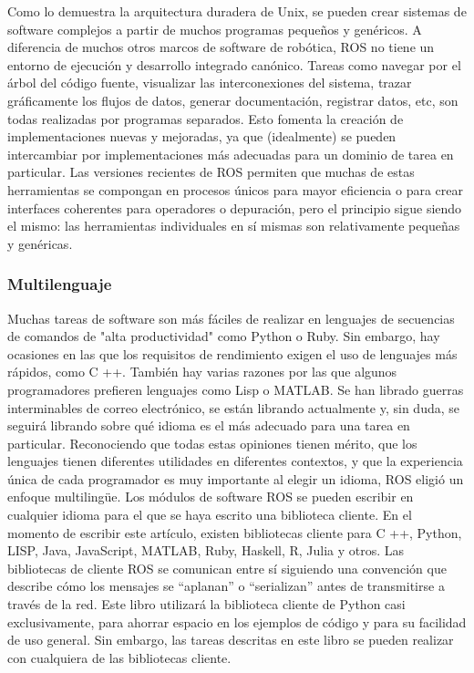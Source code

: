             Como lo demuestra la arquitectura duradera de Unix, se pueden crear sistemas de software complejos a partir de muchos programas pequeños y genéricos. A diferencia de muchos otros marcos de software de robótica, ROS no tiene un entorno de ejecución y desarrollo integrado canónico. Tareas como navegar por el árbol del código fuente, visualizar las interconexiones del sistema, trazar gráficamente los flujos de datos, generar documentación, registrar datos, etc, son todas realizadas por programas separados. Esto fomenta la creación de implementaciones nuevas y mejoradas, ya que (idealmente) se pueden intercambiar por implementaciones más adecuadas para un dominio de tarea en particular. Las versiones recientes de ROS permiten que muchas de estas herramientas se compongan en procesos únicos para mayor eficiencia o para crear interfaces coherentes para operadores o depuración, pero el principio sigue siendo el mismo: las herramientas individuales en sí mismas son relativamente pequeñas y genéricas.
            
        \subsubsection{Multilenguaje}
        
            Muchas tareas de software son más fáciles de realizar en lenguajes de secuencias de comandos de "alta productividad" como Python o Ruby. Sin embargo, hay ocasiones en las que los requisitos de rendimiento exigen el uso de lenguajes más rápidos, como C ++. También hay varias razones por las que algunos programadores prefieren lenguajes como Lisp o MATLAB. Se han librado guerras interminables de correo electrónico, se están librando actualmente y, sin duda, se seguirá librando sobre qué idioma es el más adecuado para una tarea en particular. Reconociendo que todas estas opiniones tienen mérito, que los lenguajes tienen diferentes utilidades en diferentes contextos, y que la experiencia única de cada programador es muy importante al elegir un idioma, ROS eligió un enfoque multilingüe. Los módulos de software ROS se pueden escribir en cualquier idioma para el que se haya escrito una biblioteca cliente. En el momento de escribir este artículo, existen bibliotecas cliente para C ++, Python, LISP, Java, JavaScript, MATLAB, Ruby, Haskell, R, Julia y otros. Las bibliotecas de cliente ROS se comunican entre sí siguiendo una convención que describe cómo los mensajes se ``aplanan'' o ``serializan'' antes de transmitirse a través de la red. Este libro utilizará la biblioteca cliente de Python casi exclusivamente, para ahorrar espacio en los ejemplos de código y para su facilidad de uso general. Sin embargo, las tareas descritas en este libro se pueden realizar con cualquiera de las bibliotecas cliente.
            
